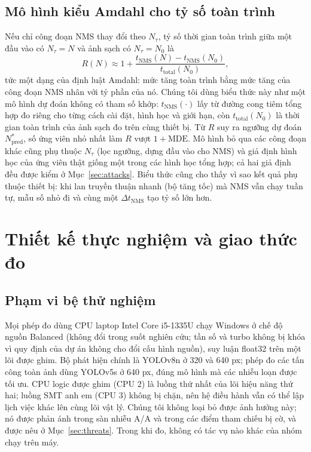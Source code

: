 \documentclass[a4paper,fleqn]{cas-dc}
\newcommand{\Ntau}{N_{\tau}}
\begin{document}
\subsection{Mô hình kiểu Amdahl cho tỷ số toàn trình}
\label{sec:amdahl}
Nếu chỉ công đoạn NMS thay đổi theo $\Ntau$, tỷ số thời gian toàn trình giữa một đầu vào có $\Ntau = N$ và ảnh sạch có $\Ntau = N_0$ là
\begin{equation}
R(N) \approx 1 + \frac{t_{\mathrm{NMS}}(N) - t_{\mathrm{NMS}}(N_0)}{t_{\mathrm{total}}(N_0)} ,
\end{equation}
tức một dạng của định luật Amdahl: mức tăng toàn trình bằng mức tăng của công đoạn NMS nhân với tỷ phần của nó. Chúng tôi dùng biểu thức này như một mô hình dự đoán không có tham số khớp: $t_{\mathrm{NMS}}(\cdot)$ lấy từ đường cong tiêm tổng hợp đo riêng cho từng cách cài đặt, hình học và giới hạn, còn $t_{\mathrm{total}}(N_0)$ là thời gian toàn trình của ảnh sạch đo trên cùng thiết bị. Từ $R$ suy ra ngưỡng dự đoán $N^{*}_{\mathrm{pred}}$, số ứng viên nhỏ nhất làm $R$ vượt $1+\mathrm{MDE}$. Mô hình bỏ qua các công đoạn khác cũng phụ thuộc $\Ntau$ (lọc ngưỡng, dựng đầu vào cho NMS) và giả định hình học của ứng viên thật giống một trong các hình học tổng hợp; cả hai giả định đều được kiểm ở Mục~\ref{sec:attacks}. Biểu thức cũng cho thấy vì sao kết quả phụ thuộc thiết bị: khi lan truyền thuận nhanh (bộ tăng tốc) mà NMS vẫn chạy tuần tự, mẫu số nhỏ đi và cùng một $\Delta t_{\mathrm{NMS}}$ tạo tỷ số lớn hơn.

\section{Thiết kế thực nghiệm và giao thức đo}
\label{sec:protocol}
\subsection{Phạm vi bệ thử nghiệm}
Mọi phép đo dùng CPU laptop Intel Core i5-1335U chạy Windows ở chế độ nguồn Balanced (không đổi trong suốt nghiên cứu; tần số và turbo không bị khóa vì quy định của dự án không cho đổi cấu hình nguồn), suy luận float32 trên một lõi được ghim. Bộ phát hiện chính là YOLOv8n ở 320 và 640 px; phép đo các tấn công toàn ảnh dùng YOLOv5s ở 640 px, đúng mô hình mà các nhiễu loạn được tối ưu. CPU logic được ghim (CPU 2) là luồng thứ nhất của lõi hiệu năng thứ hai; luồng SMT anh em (CPU 3) không bị chặn, nên hệ điều hành vẫn có thể lập lịch việc khác lên cùng lõi vật lý. Chúng tôi không loại bỏ được ảnh hưởng này; nó được phản ánh trong sàn nhiễu A/A và trong các điểm tham chiếu bị cờ, và được nêu ở Mục~\ref{sec:threats}. Trong khi đo, không có tác vụ nào khác của nhóm chạy trên máy.
\end{document}
